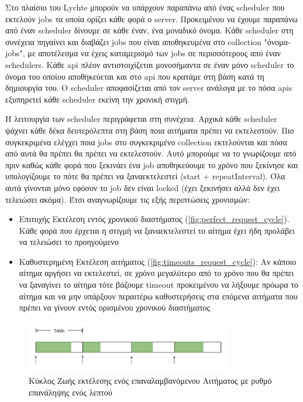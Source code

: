 Στο πλαίσιο του Lychte μπορούν να υπάρχουν παραπάνω από ένας scheduler που εκτελούν jobs τα οποία ορίζει κάθε φορά ο server. Προκειμένου να έχουμε παραπάνω από έναν scheduler δίνουμε σε κάθε έναν, ένα μοναδικό όνομα. Κάθε scheduler στη συνέχεια πηγαίνει και διαβάζει jobs που είναι αποθηκευμένα στο collection "όνομα-jobs", με αποτέλεσμα να έχεις καταμερισμό των jobs σε περισσότερους από έναν schedulers. Κάθε api πλέον αντιστοιχίζεται μονοσήμαντα σε έναν μόνο scheduler το όνομα του οποίου αποθηκεύεται και στο api που κρατάμε στη βάση κατά τη δημιουργία του. Ο scheduler αποφασίζεται από τον server ανάλογα με το πόσα apis εξυπηρετεί κάθε scheduler εκείνη την χρονική στιγμή.

Η λειτουργία των scheduler περιγράφεται στη συνέχεια. Αρχικά κάθε scheduler ψάχνει κάθε δέκα δευτερόλεπτα στη βάση ποια αιτήματα πρέπει να εκτελεστούν. Πιο συγκεκριμένα ελέγχει ποια jobs στο συγκεκριμένο collection εκτελούνται και πόσα από αυτά θα πρέπει θα πρέπει να εκτελεστούν. Αυτό μπορούμε να το γνωρίζουμε από πριν καθώς κάθε φορά που ξεκινάει ένα job αποθηκεύουμε το χρόνο που ξεκίνησε και υπολογίζουμε το πότε θα πρέπει να ξαναεκτελεστεί (start + repeatInterval). Όλα αυτά γίνονται μόνο εφόσον το job δεν είναι locked (έχει ξεκινήσει αλλά δεν έχει τελειώσει ακόμα). Έτσι αναγνωρίζουμε τις εξής περιπτώσεις χρονισμών:

\begin{itemize}
    \item Επιτυχής Εκτέλεση εντός χρονικού διαστήματος (\autoref{fig:perfect_request_cycle}). Κάθε φορά που έρχεται η στιγμή να ξαναεκτελεστεί το αίτημα έχει ήδη προλάβει να τελειώσει το προηγούμενο
    \item Καθυστερημένη Εκτέλεση αιτήματος (\autoref{fig:timeouts_request_cycle}): Αν κάποιο αίτημα αργήσει να εκτελεστεί, σε χρόνο μεγαλύτερο από το χρόνο που θα πρέπει να ξαναγίνει το αίτημα τότε βάζουμε timeout προκειμένου να λήξουμε πρόωρα το αίτημα και να μην υπάρξουν περαιτέρω καθυστερήσεις στα επόμενα αιτήματα που πρέπει να γίνουν εντός ορισμένου χρονικού διαστήματος
\end{itemize}

\begin{figure}[!ht]
	\centering
	\includegraphics[width=0.8\textwidth]{./images/chapter4/perfect_request_cycle.png}
	\caption[Κύκλος Ζωής εκτέλεσης ενός επαναλαμβανόμενου Αιτήματος με ρυθμό επανάληψης ενός λεπτού]{Κύκλος Ζωής εκτέλεσης ενός επαναλαμβανόμενου Αιτήματος με ρυθμό επανάληψης ενός λεπτού}
	\label{fig:perfect_request_cycle}
\end{figure}

